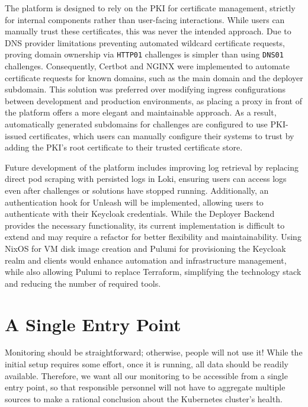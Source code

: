 The platform is designed to rely on the PKI for certificate management, strictly for internal components rather than user-facing interactions. While users can manually trust these certificates, this was never the intended approach. Due to DNS provider limitations preventing automated wildcard certificate requests, proving domain ownership via \texttt{HTTP01} challenges is simpler than using \texttt{DNS01} challenges. Consequently, Certbot and NGINX were implemented to automate certificate requests for known domains, such as the main domain and the deployer subdomain. This solution was preferred over modifying ingress configurations between development and production environments, as placing a proxy in front of the platform offers a more elegant and maintainable approach. As a result, automatically generated subdomains for challenges are configured to use PKI-issued certificates, which users can manually configure their systems to trust by adding the PKI's root certificate to their trusted certificate store.

Future development of the platform includes improving log retrieval by replacing direct pod scraping with persisted logs in Loki, ensuring users can access logs even after challenges or solutions have stopped running. Additionally, an authentication hook for Unleash will be implemented, allowing users to authenticate with their Keycloak credentials. While the Deployer Backend provides the necessary functionality, its current implementation is difficult to extend and may require a refactor for better flexibility and maintainability. Using NixOS for VM disk image creation and Pulumi for provisioning the Keycloak realm and clients would enhance automation and infrastructure management, while also allowing Pulumi to replace Terraform, simplifying the technology stack and reducing the number of required tools.

\cleardoublepage
{}
{}
\printbibliography


\section{A Single Entry Point}
Monitoring should be straightforward; otherwise, people will not use it! While the initial setup requires some effort, once it is running, all data should be readily available. Therefore, we want all our monitoring to be accessible from a single entry point, so that responsible personnel will not have to aggregate multiple sources to make a rational conclusion about the Kubernetes cluster's health.

